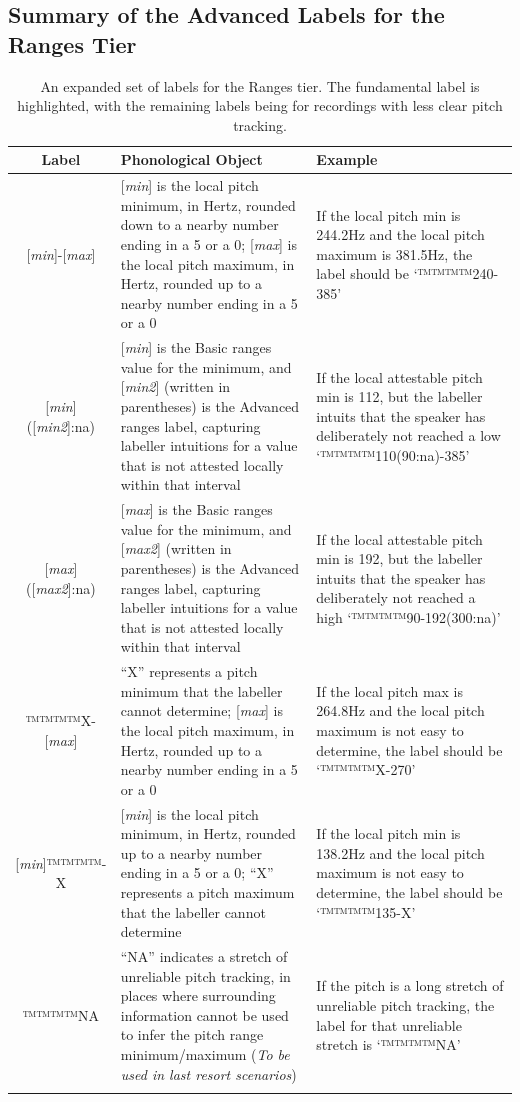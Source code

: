 \documentclass[11pt, twoside]{memoir}
\begin{document}
\subsection{Summary of the Advanced Labels for the Ranges Tier}\label{sec:summary-advanced-ranges-labels}
\begin{longtable}{cp{.46\linewidth}p{.32\linewidth}} \toprule \textbf{Label} & \textbf{Phonological Object} & \textbf{Example}\tabularnewline
\midrule \endhead
\rowcolor{green}
{[\textit{min}]-[\textit{max}]} &
	{[\textit{min}] is the local pitch minimum, in Hertz, rounded down to a nearby number ending in a 5 or a 0}; {[\textit{max}] is the local pitch maximum, in Hertz, rounded up to a nearby number ending in a 5 or a 0} &
	If the local pitch min is 244.2Hz and the local pitch maximum is 381.5Hz, the label should be ‘™™™™{240-385}’
	\tabularnewline
{[\textit{min}]([\textit{min2}]:na)} &
	[\textit{min}] is the Basic ranges value for the minimum, and [\textit{min2}] (written in parentheses) is the Advanced ranges label, capturing labeller intuitions for a value that is not attested locally within that interval &
	If the local attestable pitch min is 112, but the labeller intuits that the speaker has deliberately not reached a low ‘™™™™{110(90:na)-385}’
	\tabularnewline
{[\textit{max}]([\textit{max2}]:na)} &
	[\textit{max}] is the Basic ranges value for the minimum, and [\textit{max2}] (written in parentheses) is the Advanced ranges label, capturing labeller intuitions for a value that is not attested locally within that interval &
	If the local attestable pitch min is 192, but the labeller intuits that the speaker has deliberately not reached a high ‘™™™™{90-192(300:na)}’
	\tabularnewline
{™™™™{X-}[\textit{max}]} &
	{“X” represents a pitch minimum that the labeller cannot determine}; {[\textit{max}] is the local pitch maximum, in Hertz, rounded up to a nearby number ending in a 5 or a 0}	 &
	If the local pitch max is 264.8Hz and the local pitch maximum is not easy to determine, the label should be ‘™™™™{X-270}’
	\tabularnewline
{[\textit{min}]™™™™{-X}} &
	{[\textit{min}] is the local pitch minimum, in Hertz, rounded up to a nearby number ending in a 5 or a 0}; {“X” represents a pitch maximum that the labeller cannot determine}	 &
	If the local pitch min is 138.2Hz and the local pitch maximum is not easy to determine, the label should be ‘™™™™{135-X}’
	\tabularnewline
™™™™{NA} &
	“NA” indicates a stretch of unreliable pitch tracking, in places where surrounding information cannot be used to infer the pitch range minimum\slash maximum (\textit{To be used in last resort scenarios}) &
	If the pitch is a long stretch of unreliable pitch tracking, the label for that unreliable stretch is ‘™™™™{NA}’
	\tabularnewline
\bottomrule 
\caption[An expanded set of labels for the Ranges tier.]{An expanded set of labels for the Ranges tier. The fundamental label is highlighted, with the remaining labels being for recordings with less clear pitch tracking.}
\end{longtable}
\end{document}
